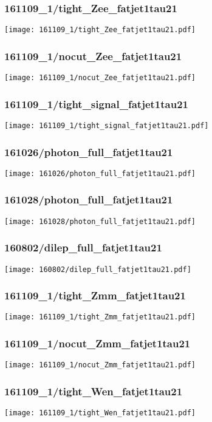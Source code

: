 \begin{frame}
   \frametitle{\small 161109\_1/tight\_Zee\_fatjet1tau21}
   \centering
   \texttt{[image: 161109\_1/tight\_Zee\_fatjet1tau21.pdf]}
\end{frame}

\begin{frame}
   \frametitle{\small 161109\_1/nocut\_Zee\_fatjet1tau21}
   \centering
   \texttt{[image: 161109\_1/nocut\_Zee\_fatjet1tau21.pdf]}
\end{frame}

\begin{frame}
   \frametitle{\small 161109\_1/tight\_signal\_fatjet1tau21}
   \centering
   \texttt{[image: 161109\_1/tight\_signal\_fatjet1tau21.pdf]}
\end{frame}

\begin{frame}
   \frametitle{\small 161026/photon\_full\_fatjet1tau21}
   \centering
   \texttt{[image: 161026/photon\_full\_fatjet1tau21.pdf]}
\end{frame}

\begin{frame}
   \frametitle{\small 161028/photon\_full\_fatjet1tau21}
   \centering
   \texttt{[image: 161028/photon\_full\_fatjet1tau21.pdf]}
\end{frame}

\begin{frame}
   \frametitle{\small 160802/dilep\_full\_fatjet1tau21}
   \centering
   \texttt{[image: 160802/dilep\_full\_fatjet1tau21.pdf]}
\end{frame}

\begin{frame}
   \frametitle{\small 161109\_1/tight\_Zmm\_fatjet1tau21}
   \centering
   \texttt{[image: 161109\_1/tight\_Zmm\_fatjet1tau21.pdf]}
\end{frame}

\begin{frame}
   \frametitle{\small 161109\_1/nocut\_Zmm\_fatjet1tau21}
   \centering
   \texttt{[image: 161109\_1/nocut\_Zmm\_fatjet1tau21.pdf]}
\end{frame}

\begin{frame}
   \frametitle{\small 161109\_1/tight\_Wen\_fatjet1tau21}
   \centering
   \texttt{[image: 161109\_1/tight\_Wen\_fatjet1tau21.pdf]}
\end{frame}

